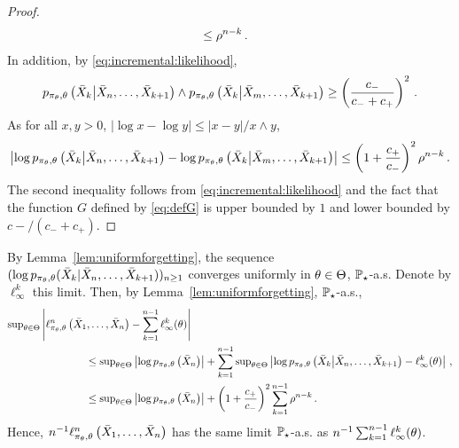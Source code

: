 \begin{proof}
\begin{align*}
&\le \rho^{n-k}\,.
\end{align*}
In addition, by \eqref{eq:incremental:likelihood}, 
\[
p_{\pi_{\theta},\theta}\left(\bar X_{k}\middle| \bar X_{n},\ldots,\bar X_{k+1}\right)\wedge p_{\pi_{\theta},\theta}\left(\bar X_{k}\middle| \bar X_{m},\ldots,\bar X_{k+1}\right)\ge \left(\frac{c_-}{c_-+c_+}\right)^2\,.
\]
As for all $x,y>0$, $|\log x - \log y| \le |x-y|/x\wedge y$,
\[
\left|\log p_{\pi_{\theta},\theta}\left(\bar X_{k}\middle| \bar X_{n},\ldots,\bar X_{k+1}\right) - \log p_{\pi_{\theta},\theta}\left(\bar X_{k}\middle| \bar X_{m},\ldots,\bar X_{k+1}\right)\right| \le \left(1+\frac{c_+}{c_-}\right)^2\rho^{n-k}\,.
\]
The second inequality follows from \eqref{eq:incremental:likelihood} and the fact that the function $G$ defined by \eqref{eq:defG} is upper bounded by $1$ and lower bounded by $c-/(c_-+c_+)$.
\end{proof}
By Lemma~\ref{lem:uniformforgetting}, the sequence $(\log p_{\pi_{\theta},\theta}(\bar X_{k}| \bar X_{n},\ldots,\bar X_{k+1}))_{n\ge 1}$ converges uniformly in $\theta\in\Theta$, $\mathbb{P}_{\star}$-a.s. Denote by $\ell^k_{\infty}$ this limit. Then, by Lemma~\ref{lem:uniformforgetting}, $\mathbb{P}_{\star}$-a.s.,
\begin{align*}
\sup_{\param\in\paramset}\left|\ell^n_{\pi_{\param},\param}\left(\bar X_{1},\ldots,\bar X_{n}\right) - \sum_{k=1}^{n-1}\ell^k_{\infty}(\param)\right| &\\
&\hspace{-3.5cm}\le \sup_{\param\in\paramset}\left|\log p_{\pi_{\param},\param}\left(\bar X_n\right)\right| + \sum_{k=1}^{n-1}\sup_{\param\in\paramset}\left|\log p_{\pi_{\param},\param}\left(\bar X_{k}\middle| \bar X_{n},\ldots,\bar X_{k+1}\right)-\ell^k_{\infty}(\param)\right|\eqsp,\\
&\hspace{-3.5cm}\le \sup_{\param\in\paramset}\left|\log p_{\pi_{\param},\param}\left(\bar X_n\right)\right| +  \left(1+\frac{c_+}{c_-}\right)^2\sum_{k=1}^{n-1} \rho^{n-k}\eqsp.
\end{align*}
Hence, $n^{-1}\ell^n_{\pi_{\theta},\theta}\left(\bar X_{1},\ldots,\bar X_{n}\right)$ has the same limit $\mathbb{P}_{\star}$-a.s. as $n^{-1}\sum_{k=1}^{n-1}\ell^k_{\infty}(\theta)$.
